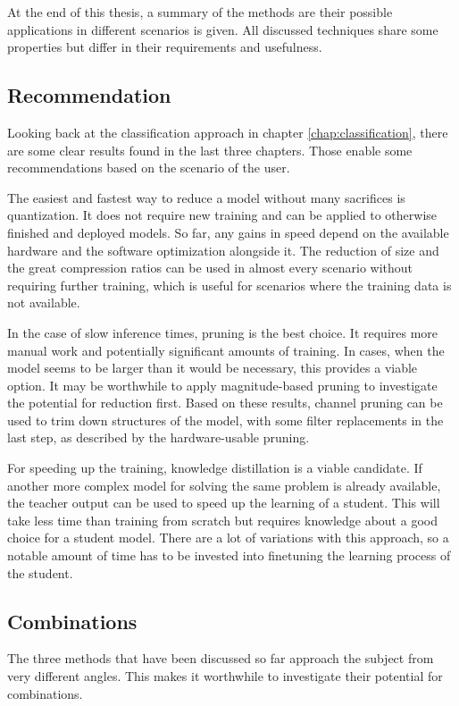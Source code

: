 
At the end of this thesis, a summary of the methods are their possible applications in different scenarios is given. All discussed techniques share some properties but differ in their requirements and usefulness.

\subsection{Recommendation}
Looking back at the classification approach in chapter \ref{chap:classification}, there are some clear results found in the last three chapters. Those enable some recommendations based on the scenario of the user.

The easiest and fastest way to reduce a model without many sacrifices is quantization. It does not require new training and can be applied to otherwise finished and deployed models. So far, any gains in speed depend on the available hardware and the software optimization alongside it. The reduction of size and the great compression ratios can be used in almost every scenario without requiring further training, which is useful for scenarios where the training data is not available.

In the case of slow inference times, pruning is the best choice. It requires more manual work and potentially significant amounts of training. In cases, when the model seems to be larger than it would be necessary, this provides a viable option. It may be worthwhile to apply magnitude-based pruning to investigate the potential for reduction first. Based on these results, channel pruning can be used to trim down structures of the model, with some filter replacements in the last step, as described by the hardware-usable pruning.

For speeding up the training, knowledge distillation is a viable candidate. If another more complex model for solving the same problem is already available, the teacher output can be used to speed up the learning of a student. This will take less time than training from scratch but requires knowledge about a good choice for a student model. There are a lot of variations with this approach, so a notable amount of time has to be invested into finetuning the learning process of the student.

\subsection{Combinations}
The three methods that have been discussed so far approach the subject from very different angles. This makes it worthwhile to investigate their potential for combinations.

